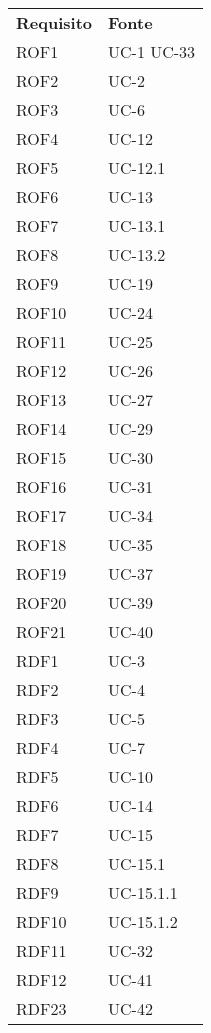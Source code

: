 \begin{longtable}{| p{5cm} | p{5cm} |}
		\rowcolor{LightBlue}
		\color{white}\bfseries Requisito & \color{white}\bfseries Fonte \\[0.25cm]
		\rowcolor{LightGray}
		ROF1 & UC-1 \newline UC-33\\
		ROF2 & UC-2\\
		\rowcolor{LightGray}
		ROF3 & UC-6\\
		ROF4 & UC-12\\
		\rowcolor{LightGray}
		ROF5 & UC-12.1\\
		ROF6 & UC-13\\
		\rowcolor{LightGray}
		ROF7 & UC-13.1\\
		ROF8 & UC-13.2\\
		\rowcolor{LightGray}
		ROF9 & UC-19\\
		ROF10 & UC-24\\
		\rowcolor{LightGray}
		ROF11 & UC-25\\
		ROF12 & UC-26\\
		\rowcolor{LightGray}
		ROF13 & UC-27\\
		ROF14 & UC-29\\
		\rowcolor{LightGray}
		ROF15 & UC-30\\
		ROF16 & UC-31\\
		\rowcolor{LightGray}
		ROF17 & UC-34\\
		ROF18 & UC-35\\
		\rowcolor{LightGray}
		ROF19 & UC-37\\
		ROF20 & UC-39\\
		\rowcolor{LightGray}
		ROF21 & UC-40\\
		RDF1 & UC-3\\
		\rowcolor{LightGray}
		RDF2 & UC-4\\
		RDF3 & UC-5\\
		\rowcolor{LightGray}
		RDF4 & UC-7\\
		RDF5 & UC-10\\
		\rowcolor{LightGray}
		RDF6 & UC-14\\
		RDF7 & UC-15\\
		\rowcolor{LightGray}
		RDF8 & UC-15.1\\
		RDF9 & UC-15.1.1\\
		\rowcolor{LightGray}
		RDF10 & UC-15.1.2\\
		RDF11 & UC-32\\
		\rowcolor{LightGray}
		RDF12 & UC-41\\
		RDF23 & UC-42\\

\end{longtable}
